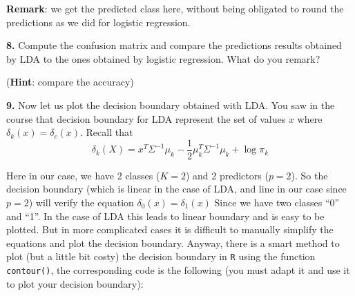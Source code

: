 \documentclass[]{book}
\theoremstyle{definition}
\theoremstyle{definition}
\theoremstyle{definition}
\theoremstyle{remark}
\begin{document}
\textbf{Remark}: we get the predicted class here, without being
obligated to round the predictions as we did for logistic regression.

\textbf{8.} Compute the confusion matrix and compare the predictions
results obtained by LDA to the ones obtained by logistic regression.
What do you remark?

(\textbf{Hint}: compare the accuracy)

\textbf{9.} Now let us plot the decision boundary obtained with LDA. You
saw in the course that decision boundary for LDA represent the set of
values \(x\) where \(\delta_k(x) = \delta_c(x)\). Recall that
\[ \delta_k(X) = x^T \Sigma^{-1} \mu_k - \frac{1}{2} \mu_k^T \Sigma^{-1}  \mu_k + \log \pi_k \]

Here in our case, we have 2 classes (\(K=2\)) and 2 predictors
(\(p=2\)). So the decision boundary (which is linear in the case of LDA,
and line in our case since \(p=2\)) will verify the equation
\(\delta_0(x) = \delta_1(x)\) Since we have two classes ``0'' and ``1''.
In the case of LDA this leads to linear boundary and is easy to be
plotted. But in more complicated cases it is difficult to manually
simplify the equations and plot the decision boundary. Anyway, there is
a smart method to plot (but a little bit costy) the decision boundary in
\texttt{R} using the function \texttt{contour()}, the corresponding code
is the following (you must adapt it and use it to plot your decision
boundary):
\end{document}
